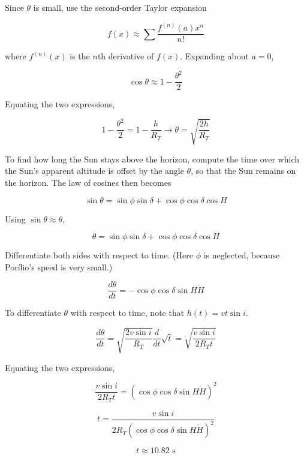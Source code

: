 \documentclass[11pt]{article}
\begin{document}
\begin{pproblem}
\begin{pssolution*}{}{ }
\begin{alternativas}
            Since \(\theta\) is small, use the second-order Taylor expansion 

            \[f(x) \approx \sum \frac{f^{(n)}(a) x^n}{n!}\]

            where \(f^{(n)}(x)\) is the \(n\)th derivative of \(f(x)\). Expanding about \(a = 0\), 

            \[\cos\theta \approx 1 - \frac{\theta^2}{2}\]

            Equating the two expressions, 

            \[1 - \frac{\theta^2}{2} = 1 - \frac{h}{R_T} \rightarrow \theta = \sqrt{\frac{2h}{R_T}}\]

            To find how long the Sun stays above the horizon, compute the time over which the Sun's apparent altitude is offset by the angle \(\theta\), so that the Sun remains on the horizon. The law of cosines then becomes 

            \[\sin\theta = \sin\phi\sin\delta + \cos\phi\cos\delta\cos H\]

            Using \(\sin\theta \approx \theta\), 

            \[\theta = \sin\phi\sin\delta + \cos\phi\cos\delta\cos H\]

            Differentiate both sides with respect to time. (Here \(\dot{\phi}\) is neglected, because Porílio's speed is very small.)

            \[\frac{d\theta}{dt} = -\cos\phi\cos\delta\sin H \dot{H}\]

            To differentiate \(\theta\) with respect to time, note that \(h(t) = v t \sin i\).

            \[\frac{d\theta}{dt} = \sqrt{\frac{2v\sin i }{R_T}}\frac{d}{dt}\sqrt{t} = \sqrt{\frac{v\sin i}{2 R_T t}}\]

            Equating the two expressions, 

            \[\frac{v\sin i}{2R_T t} = (\cos\phi\cos\delta\sin H \dot{H})^2\]

            \[t = \frac{v\sin i}{2R_T(\cos\phi\cos\delta\sin H \dot{H})^2}\]

            \[\boxed{t \approx 10.82 \text{ s}}\]

    \end{alternativas}
    
\end{pssolution*}
\end{pproblem}
\end{document}
